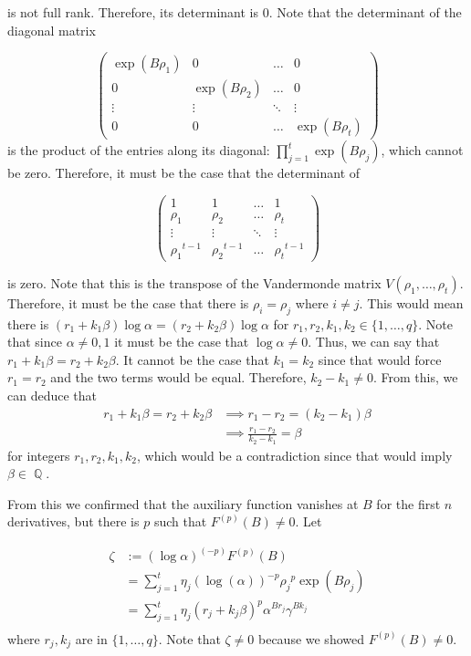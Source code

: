 \documentclass[a4paper, 11pt]{book}
\DeclareMathOperator{\Q}{\mathbb{Q}}
\begin{document}
is not full rank. Therefore, its determinant is $0$. Note that the determinant of the diagonal matrix

\[\begin{pmatrix}
        \exp(B\rho_1) & 0 & \hdots & 0 \\
        0 & \exp(B\rho_2) & \hdots & 0 \\
        \vdots & \vdots & \ddots & \vdots \\
        0 & 0 & \hdots & \exp(B\rho_t) 
    \end{pmatrix}\]
is the product of the entries along its diagonal: $\prod\limits_{j=1}^{t}\exp(B\rho_{j})$, which cannot be zero. Therefore, it must be the case that the determinant of 

\[\begin{pmatrix}
        1 & 1 & \hdots & 1 \\
        \rho_{1} & \rho_{2} & \hdots & {\rho_t} \\ 
        \vdots & \vdots & \ddots & \vdots \\
        {\rho_{1}}^{t-1} & {\rho_{2}}^{t-1} & \hdots & {\rho_t}^{t-1}
    \end{pmatrix}\] 

    is zero. Note that this is the transpose of the Vandermonde matrix $V(\rho_1, \ldots, \rho_t)$. Therefore, it must be the case that there is $\rho_i = \rho_j$ where $i \neq j$. This would mean there is $\left(r_1 + k_1 \beta \right)\log \alpha = \left(r_2 + k_2 \beta\right) \log \alpha$ for $r_1, r_2, k_1, k_2 \in \{1, \ldots, q\}$. Note that since $\alpha \neq 0, 1$ it must be the case that $\log \alpha \neq 0$. Thus, we can say that $r_1 + k_1 \beta = r_2 + k_2 \beta$. It cannot be the case that $k_1 = k_2$ since that would force $r_1 = r_2$ and the two terms would be equal. Therefore, $k_2 - k_1 \neq 0$. From this, we can deduce that  
    \begin{align*}
        r_1 + k_1 \beta = r_2 + k_2 \beta &\implies r_1 - r_2 = (k_2 - k_1) \beta \\
                                          &\implies \frac{r_1 - r_2}{k_2 - k_1} = \beta
    \end{align*}
for integers $r_1, r_2, k_1, k_2$, which would be a contradiction since that would imply $\beta \in \Q$.\par

From this we confirmed that the auxiliary function vanishes at $B$ for the first $n$ derivatives, but there is $p$ such that $F^{(p)}(B) \neq 0$. Let 

\begin{align*}
    \zeta &:= {(\log \alpha)}^{(-p)}F^{(p)}(B) \\
          &= \sum\limits_{j=1}^{t}\eta_{j}{\left(\log(\alpha)\right)}^{-p}{\rho_{j}}^{p}\exp(B\rho_j) \\
          &= \sum\limits_{j=1}^{t} \eta_{j}{\left(r_j + k_j \beta\right)}^{p}{\alpha}^{Br_{j}}{\gamma}^{Bk_{j}} \\
\end{align*}
where $r_j, k_j$ are in $\{1, \ldots, q\}$. Note that $\zeta \neq 0$ because we showed $F^{(p)}(B) \neq 0$.\par
\end{document}
